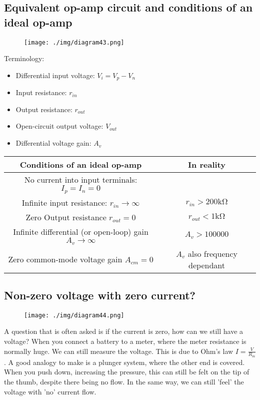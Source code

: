 \subsection{Equivalent op-amp circuit and conditions of an ideal op-amp}
\begin{figure}[H]
  \centering
  \texttt{[image: ./img/diagram43.png]}
\end{figure}
Terminology:
\begin{itemize}
  \item Differential input voltage: $V_i = V_p - V_n$
  \item Input resistance: $r_{in}$
  \item Output resistance: $r_{out}$
  \item Open-circuit output voltage: $V_{out}$
  \item Differential voltage gain: $A_v$
\end{itemize}
\begin{center}
  \begin{tabular}{ |c|c| }
    \hline
    \textbf{Conditions of an ideal op-amp}                             & \textbf{In reality}            \\
    \hline
    \hline
    No current into input terminals: $I_p = I_n = 0$                   &                                \\
    \hline
    Infinite input resistance: $r_{in} \rightarrow \infty$             & $r_{in} > 200 \si{\kilo \ohm}$ \\
    \hline
    Zero Output resistance $r_{out} = 0$                               & $r_{out} < 1 \si{\kilo\ohm}$   \\
    \hline
    Infinite differential (or open-loop) gain $A_v \rightarrow \infty$ & $A_v > 100000$                 \\
    \hline
    Zero common-mode voltage gain $A_{cm} = 0$                         & $A_v$ also frequency dependant \\
    \hline
  \end{tabular}
\end{center}
\subsection{Non-zero voltage with zero current?}
\begin{figure}[H]
  \centering
  \texttt{[image: ./img/diagram44.png]}
\end{figure}
A question that is often asked is if the current is zero, how can we still have a voltage? When you connect a battery to a meter, where the meter resistance is normally huge. We can still measure the voltage. This is due to Ohm's law $I = \frac{V}{R_m}$. A good analogy to make is a plunger system, where the other end is covered. When you push down, increasing the pressure, this can still be felt on the tip of the thumb, despite there being no flow. In the same way, we can still 'feel' the voltage with 'no' current flow.
